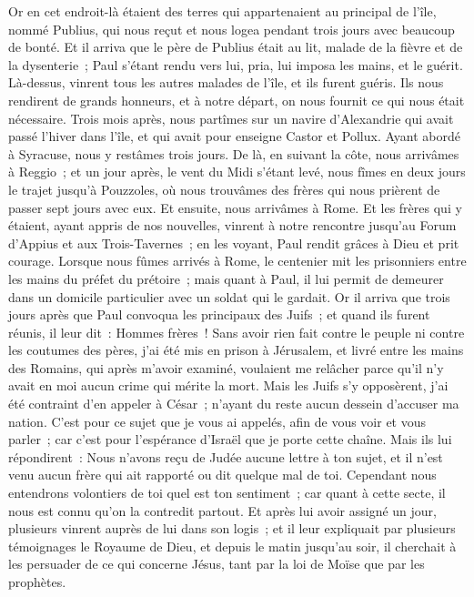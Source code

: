 \begin{multicols}{2}
Or en cet endroit-là étaient des terres qui appartenaient au principal de l'île, nommé Publius, qui nous reçut et nous logea pendant trois jours avec beaucoup de bonté.
Et il arriva que le père de Publius était au lit, malade de la fièvre et de la dysenterie~; Paul s'étant rendu vers lui, pria, lui imposa les mains, et le guérit.
Là-dessus, vinrent tous les autres malades de l'île, et ils furent guéris.
Ils nous rendirent de grands honneurs, et à notre départ, on nous fournit ce qui nous était nécessaire.
Trois mois après, nous partîmes sur un navire d'Alexandrie qui avait passé l'hiver dans l'île, et qui avait pour enseigne Castor et Pollux.
Ayant abordé à Syracuse, nous y restâmes trois jours.
De là, en suivant la côte, nous arrivâmes à Reggio~; et un jour après, le vent du Midi s'étant levé, nous fîmes en deux jours le trajet jusqu'à Pouzzoles,
où nous trouvâmes des frères qui nous prièrent de passer sept jours avec eux. Et ensuite, nous arrivâmes à Rome.
Et les frères qui y étaient, ayant appris de nos nouvelles, vinrent à notre rencontre jusqu'au Forum d'Appius et aux Trois-Tavernes~; en les voyant, Paul rendit grâces à Dieu et prit courage.
Lorsque nous fûmes arrivés à Rome, le centenier mit les prisonniers entre les mains du préfet du prétoire~; mais quant à Paul, il lui permit de demeurer dans un domicile particulier avec un soldat qui le gardait.
Or il arriva que trois jours après que Paul convoqua les principaux des Juifs~; et quand ils furent réunis, il leur dit~: Hommes frères~! Sans avoir rien fait contre le peuple ni contre les coutumes des pères, j'ai été mis en prison à Jérusalem, et livré entre les mains des Romains,
qui après m'avoir examiné, voulaient me relâcher parce qu'il n'y avait en moi aucun crime qui mérite la mort.
Mais les Juifs s'y opposèrent, j'ai été contraint d'en appeler à César~; n'ayant du reste aucun dessein d'accuser ma nation.
C'est pour ce sujet que je vous ai appelés, afin de vous voir et vous parler~; car c'est pour l'espérance d'Israël que je porte cette chaîne.
Mais ils lui répondirent~: Nous n'avons reçu de Judée aucune lettre à ton sujet, et il n'est venu aucun frère qui ait rapporté ou dit quelque mal de toi.
Cependant nous entendrons volontiers de toi quel est ton sentiment~; car quant à cette secte, il nous est connu qu'on la contredit partout.
Et après lui avoir assigné un jour, plusieurs vinrent auprès de lui dans son logis~; et il leur expliquait par plusieurs témoignages le Royaume de Dieu, et depuis le matin jusqu'au soir, il cherchait à les persuader de ce qui concerne Jésus, tant par la loi de Moïse que par les prophètes.

\end{multicols}
